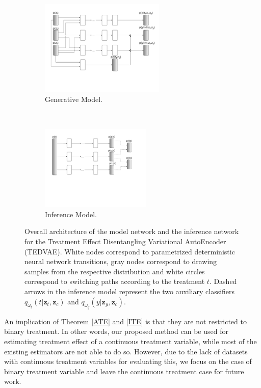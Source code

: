 \documentclass[letterpaper]{article} %
\begin{document}
\begin{figure}[!t]
	\centering
	\begin{subfigure}[b]{0.96\columnwidth}
		\centering
		\includegraphics[height=1.8in]{generative.pdf}
		\caption{Generative Model.}
	\end{subfigure}
	~
	\begin{subfigure}[b]{0.96\columnwidth}
		\centering
		\includegraphics[height=1.6in]{inference.pdf}
		\caption{Inference Model.}
	\end{subfigure}
	\caption{Overall architecture of the model network and the inference network for the Treatment  Effect Disentangling Variational AutoEncoder (TEDVAE). White nodes correspond to parametrized deterministic neural network transitions, gray nodes correspond to drawing samples from the respective distribution and white circles correspond to switching paths according to the treatment $t$. Dashed arrows in the inference model represent the two auxiliary classifiers $q_{\omega_t}(t|\mathbf{z}_t,\mathbf{z}_c)$ and $q_{\omega_y} (y|\mathbf{z}_y,\mathbf{z}_c)$.}
	\label{architecture}
\end{figure}

An implication of Theorem \ref{ATE} and \ref{ITE} is that they are not restricted to binary treatment. In other words, our proposed method can be used for estimating treatment effect of a continuous treatment variable, while most of the existing estimators are not able to do so. However, due to the lack of datasets with continuous treatment variables for evaluating this, we focus on the case of binary treatment variable and leave the continuous treatment case for future work.
\end{document}
